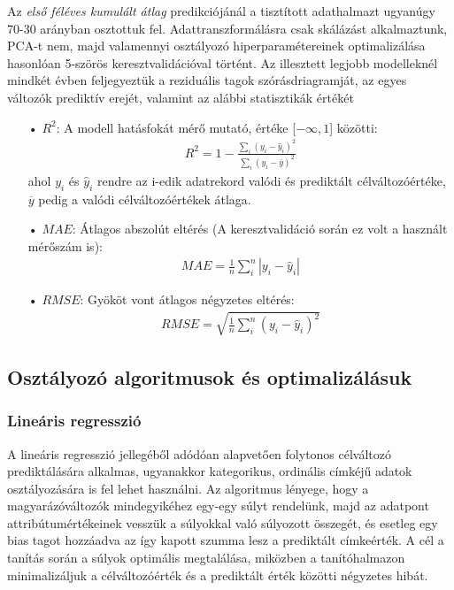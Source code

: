 \documentclass[12pt]{article}
\begin{document}
Az \textit{első féléves kumulált átlag} predikciójánál a tisztított adathalmazt ugyanúgy 70-30 arányban osztottuk fel. Adattranszformálásra csak skálázást alkalmaztunk, PCA-t nem, majd valamennyi osztályozó hiperparamétereinek optimalizálása hasonlóan 5-szörös keresztvalidációval történt. Az illesztett legjobb modelleknél mindkét évben feljegyeztük a reziduális tagok szórásdriagramját, az egyes változók prediktív erejét, valamint az alábbi statisztikák értékét\cite{bolla_stat}
\begin{itemize}
\item[•] $R^2$: A modell hatásfokát mérő mutató, értéke [$-\infty,1$] közötti:
\begin{align}
R^2 = 1 - \frac{\sum_i (y_i - \hat{y}_i)^2}{\sum_i (y_i - \overline{y})^2}
\end{align} 
ahol $y_i$ és $\hat{y}_i$ rendre az i-edik adatrekord valódi és prediktált célváltozóértéke, $\overline{y}$ pedig a valódi célváltozóértékek átlaga.
\item[•] $MAE$: Átlagos abszolút eltérés (A keresztvalidáció során ez volt a használt mérőszám is):
\begin{align}
MAE = \frac{1}{n}\sum_i^n |y_i -\hat{y}_i| 
\end{align}
\item[•] $RMSE$: Gyököt vont átlagos négyzetes eltérés:
\begin{align}
RMSE = \sqrt{\frac{1}{n}\sum_i^n (y_i - \hat{y}_i)^2}
\end{align}
\end{itemize}






\subsection{Osztályozó algoritmusok és optimalizálásuk}

\subsubsection{Lineáris regresszió}

A lineáris regresszió jellegéből adódóan alapvetően folytonos célváltozó prediktálására alkalmas, ugyanakkor kategorikus, ordinális címkéjű adatok osztályozására is fel lehet használni. Az algoritmus lényege, hogy a magyarázóváltozók mindegyikéhez egy-egy súlyt rendelünk, majd az adatpont attribútumértékeinek vesszük a súlyokkal való súlyozott összegét, és esetleg egy bias tagot hozzáadva az így kapott szumma lesz a prediktált címkeérték. A cél a tanítás során a súlyok optimális megtalálása, miközben a tanítóhalmazon minimalizáljuk a célváltozóérték és a prediktált érték közötti négyzetes hibát.
\end{document}
